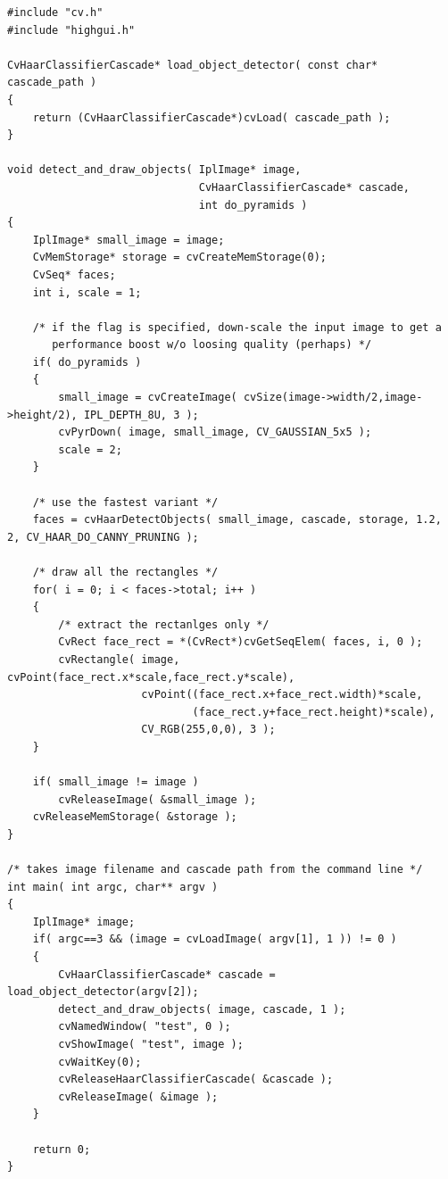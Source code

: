 \begin{lstlisting}
#include "cv.h"
#include "highgui.h"

CvHaarClassifierCascade* load_object_detector( const char* cascade_path )
{
    return (CvHaarClassifierCascade*)cvLoad( cascade_path );
}

void detect_and_draw_objects( IplImage* image,
                              CvHaarClassifierCascade* cascade,
                              int do_pyramids )
{
    IplImage* small_image = image;
    CvMemStorage* storage = cvCreateMemStorage(0);
    CvSeq* faces;
    int i, scale = 1;

    /* if the flag is specified, down-scale the input image to get a
       performance boost w/o loosing quality (perhaps) */
    if( do_pyramids )
    {
        small_image = cvCreateImage( cvSize(image->width/2,image->height/2), IPL_DEPTH_8U, 3 );
        cvPyrDown( image, small_image, CV_GAUSSIAN_5x5 );
        scale = 2;
    }

    /* use the fastest variant */
    faces = cvHaarDetectObjects( small_image, cascade, storage, 1.2, 2, CV_HAAR_DO_CANNY_PRUNING );

    /* draw all the rectangles */
    for( i = 0; i < faces->total; i++ )
    {
        /* extract the rectanlges only */
        CvRect face_rect = *(CvRect*)cvGetSeqElem( faces, i, 0 );
        cvRectangle( image, cvPoint(face_rect.x*scale,face_rect.y*scale),
                     cvPoint((face_rect.x+face_rect.width)*scale,
                             (face_rect.y+face_rect.height)*scale),
                     CV_RGB(255,0,0), 3 );
    }

    if( small_image != image )
        cvReleaseImage( &small_image );
    cvReleaseMemStorage( &storage );
}

/* takes image filename and cascade path from the command line */
int main( int argc, char** argv )
{
    IplImage* image;
    if( argc==3 && (image = cvLoadImage( argv[1], 1 )) != 0 )
    {
        CvHaarClassifierCascade* cascade = load_object_detector(argv[2]);
        detect_and_draw_objects( image, cascade, 1 );
        cvNamedWindow( "test", 0 );
        cvShowImage( "test", image );
        cvWaitKey(0);
        cvReleaseHaarClassifierCascade( &cascade );
        cvReleaseImage( &image );
    }

    return 0;
}
\end{lstlisting}

\label{SetImagesForHaarClassifierCascade}

